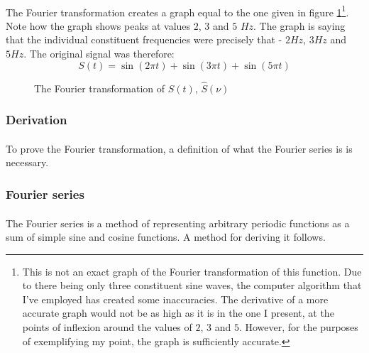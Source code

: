\documentclass{article}
\begin{document}
\paragraph*{}
The Fourier transformation creates a graph equal to the one given in figure
\ref{fig:ft-unk-func}\footnote{This is not an exact graph of the Fourier
	transformation of this function. Due to there being only three constituent
	sine waves, the computer algorithm that I've employed has created some
	inaccuracies. The derivative of a more accurate graph would not be as high
	as it is in the one I present, at the points of inflexion around the values
	of $2$, $3$ and $5$. However, for the purposes of exemplifying my point,
the graph is sufficiently accurate.}. Note how the graph shows peaks at values
$2$, $3$ and $5$ $\si{Hz}$. The graph is saying that the individual constituent
frequencies were precisely that - $2\si{Hz}$, $3\si{Hz}$ and $5\si{Hz}$. The
original signal was therefore:
$$S(t) = \sin(2 \pi t) + \sin(3 \pi t) + \sin(5 \pi t)$$

\begin{figure}[ht]
	\centering
	\caption{The Fourier transformation of $S(t)$, $\hat{S}(\nu)$}
	\label{fig:ft-unk-func}
\end{figure}

\subsubsection{Derivation}

\paragraph*{}
To prove the Fourier transformation, a definition of what the Fourier series is
is necessary.

\subsubsection{Fourier series}

\paragraph*{}
The Fourier series is a method of representing arbitrary periodic functions as 
a sum of simple sine and cosine functions. A method for deriving it follows.
\end{document}
